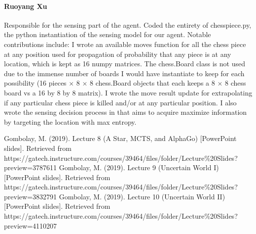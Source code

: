 \documentclass[11pt]{article}
\begin{document}
\paragraph{Ruoyang Xu} Responsible for the sensing part of the agent. Coded the entirety of chesspiece.py, the python instantiation of the sensing model for our agent. Notable contributions include: I wrote an available moves function for all the chess piece at any position used for propagation of probability that any piece is at any location, which is kept as 16 numpy matrices. The chess.Board class is not used due to the immense number of boards I would have instantiate to keep for each possibility (16 pieces $\times$ 8 $\times$ 8 chess.Board objects that each keeps a 8 $\times$ 8 chess board vs a 16 by 8 by 8 matrix). I wrote the move result update for extrapolating if any particular chess piece is killed and/or at any particular position. I also wrote the sensing decision process in that aims to acquire maximize information by targeting the location with max entropy.

\iffalse
\begin{thebibliography}{9}
    \bibitem{cancer} 
    Author
    \textit{"place holder"}. 
    SIAM News, Volume 23, Number 5, September 1990, pp 1 \& 18. 
\end{thebibliography}
\fi

\begin{thebibliography}{9}
    Gombolay, M. (2019).
    \textit{}
    Lecture 8 (A Star, MCTS, and AlphaGo) [PowerPoint slides]. Retrieved from https://gatech.instructure.com/courses/39464/files/folder/Lecture\%20Slides?preview=3787611
    Gombolay, M. (2019).
    \textit{} 
    Lecture 9 (Uncertain World I) [PowerPoint slides]. Retrieved from https://gatech.instructure.com/courses/39464/files/folder/Lecture\%20Slides?preview=3832791
    Gombolay, M. (2019).
    \textit{}
    Lecture 10 (Uncertain World II) [PowerPoint slides]. Retrieved from https://gatech.instructure.com/courses/39464/files/folder/Lecture\%20Slides?preview=4110207
\end{thebibliography}
\end{document}
